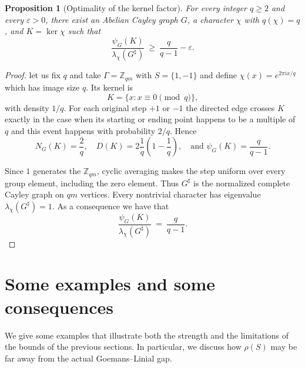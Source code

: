 \documentclass[11pt]{article}
\newtheorem{proposition}[theorem]{Proposition}
\theoremstyle{definition}
\theoremstyle{remark}
\newcommand{\Z}{\mathbb{Z}}
\newcommand{\eps}{\varepsilon}
\newcommand{\gl}{\operatorname{SDP_{GL}}}
\begin{document}
\begin{proposition}[Optimality of the kernel factor]\label{prop:kernel-sharp}
For every integer $q\ge2$ and every $\eps>0$, there exist an Abelian Cayley graph $G$, a character $\chi$ with $q(\chi)=q$, and $K=\ker\chi$ such that
\[
  \frac{\psi_G(K)}{\lambda_\chi(G^\sharp)}
  ~\geq~ \frac{q}{q-1}-\eps.
\]
\end{proposition}

\begin{proof}
let us fix $q$ and take $\Gamma=\Z_{qm}$ with $S=\{1,-1\}$ and define $\chi(x)=e^{2\pi ix/q}$ which has image size $q$. Its kernel is
\[
  K=\big\{x:x\equiv0\pmod q\big\},
\]
with density $1/q$. For each original step $+1$ or $-1$ the directed edge crosses $K$ exactly in the case when its starting or ending point happens to be a multiple of $q$ and this  event happens with probability $2/q$. Hence
\[
  N_G(K)=\frac2q,
  \quad
  D(K)=2\frac1q\left(1-\frac1q\right),
  \quad \mbox{and } \psi_G(K)=\frac{q}{q-1}.
\]

Since $1$ generates the $\Z_{qm}$, cyclic averaging makes the step uniform over every  group element, including the zero element. Thus $G^\sharp$ is the normalized complete Cayley graph on $qm$ vertices. Every nontrivial character has eigenvalue $\lambda_\chi(G^\sharp)=1$. As a consequence we have that
\[
  \frac{\psi_G(K)}{\lambda_\chi(G^\sharp)}
  ~=~\frac{q}{q-1}.
\]
\end{proof}
\fi



\section{Some examples and some consequences}\label{sec:examples}

We  give some examples that illustrate both the strength and the limitations of the  bounds of the previous sections. In particular, we discuss how $\rho(S)$ may be far away from the actual Goemans–Linial gap. 
\end{document}
